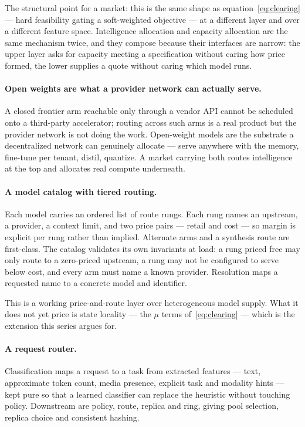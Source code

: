 \documentclass[11pt,a4paper]{article}
\begin{document}
The structural point for a market: this is the same shape as
equation~\eqref{eq:clearing} --- hard feasibility gating a soft-weighted objective
--- at a different layer and over a different feature space. Intelligence
allocation and capacity allocation are the same mechanism twice, and they compose
because their interfaces are narrow: the upper layer asks for capacity meeting a
specification without caring how price formed, the lower supplies a quote without
caring which model runs.

\paragraph{Open weights are what a provider network can actually serve.} A closed
frontier arm reachable only through a vendor API cannot be scheduled onto a
third-party accelerator; routing across such arms is a real product but the
provider network is not doing the work. Open-weight models are the substrate a
decentralized network can genuinely allocate --- serve anywhere with the memory,
fine-tune per tenant, distil, quantize. A market carrying both routes intelligence
at the top and allocates real compute underneath.

\paragraph{A model catalog with tiered routing.} Each model carries an ordered
list of route rungs. Each rung names an upstream, a provider, a context limit,
and two price pairs --- retail and cost --- so margin is explicit per rung rather
than implied. Alternate arms and a synthesis route are first-class. The catalog
validates its own invariants at load: a rung priced free may only route to a
zero-priced upstream, a rung may not be configured to serve below cost, and every
arm must name a known provider. Resolution maps a requested name to a concrete
model and identifier.

This is a working price-and-route layer over heterogeneous model supply. What it
does not yet price is state locality --- the $\mu$ terms of~\eqref{eq:clearing}
--- which is the extension this series argues for.

\paragraph{A request router.} Classification maps a request to a task from
extracted features --- text, approximate token count, media presence, explicit
task and modality hints --- kept pure so that a learned classifier can replace the
heuristic without touching policy. Downstream are policy, route, replica and
ring, giving pool selection, replica choice and consistent hashing.
\end{document}
